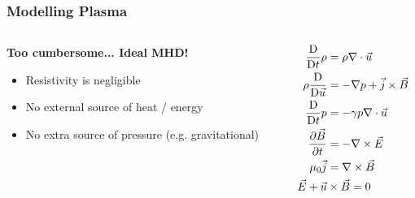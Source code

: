 \documentclass{beamer}
\newcommand{\DD}{\text{D}}
\begin{document}
\begin{frame}
\frametitle{Modelling Plasma}

\begin{columns}[T]

    \begin{column}{.5\textwidth}
        \textbf{Too cumbersome... Ideal MHD!}
        \begin{itemize}
            \item Resistivity is negligible
            \item No external source of heat / energy
            \item No extra source of pressure (e.g. gravitational)
        \end{itemize}
    \end{column}

    \begin{column}{.5\textwidth}
        \begin{align*}
            \frac{\DD}{\DD t} \rho &= \rho \nabla \cdot \vec{u} \\
            \rho \frac{\DD}{\DD \vec{u}} &= -\nabla p + \vec{j} \times \vec{B} \\
            \frac{\DD}{\DD t} p &= -\gamma p \nabla \cdot \vec{u} \\
            \pdv{\vec{B}}{t} &= -\nabla \times \vec{E} \\
            \mu_0 \vec{j} &= \nabla \times \vec{B} \\
            \vec{E} + \vec{u} &\times \vec{B} = 0
        \end{align*}
    \end{column}

\end{columns}
\end{frame}
\end{document}
